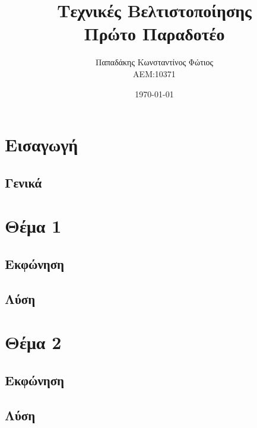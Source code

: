\documentclass[twocolumn]{report}
\begin{document}

\title{\Huge \bfseries Τεχνικές Βελτιστοποίησης \\ Πρώτο Παραδοτέο} %
\author{Παπαδάκης Κωνσταντίνος Φώτιος\vspace{0.5cm} \\  ΑΕΜ:10371} %
\date{\today}
\maketitle

\tableofcontents

\chapter{Εισαγωγή}
\section{Γενικά}


\chapter{Θέμα 1}
\section{Εκφώνηση}

\section{Λύση}


\chapter{Θέμα 2}
\section{Εκφώνηση}

\section{Λύση}

\end{document}
